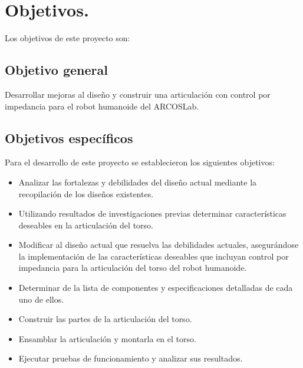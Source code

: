 \section{Objetivos.}
Los objetivos de este proyecto son:

\subsection{Objetivo general}
Desarrollar mejoras al diseño y construir una articulación con control por impedancia para el robot humanoide del ARCOSLab. 

\subsection{Objetivos específicos}
Para el desarrollo de este proyecto se establecieron los siguientes objetivos:

\begin{itemize} %
\item Analizar las fortalezas y debilidades del diseño actual mediante la recopilación de los diseños existentes.
\item Utilizando resultados de investigaciones previas determinar características deseables en la articulación del torso. 
\item Modificar al diseño actual que resuelva las debilidades actuales, asegurándose la implementación de las características deseables que incluyan control por impedancia para la articulación del torso del robot humanoide.
\item Determinar de la lista de componentes y especificaciones detalladas de cada uno de ellos.
\item Construir las partes de la articulación del torso.
\item Ensamblar la articulación y montarla en el torso.
\item Ejecutar pruebas de funcionamiento y analizar sus resultados.
\end{itemize}

